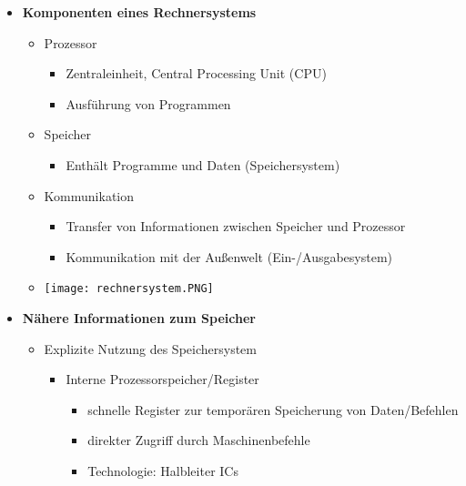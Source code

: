 \begin{itemize}
        \item \textbf{Komponenten eines Rechnersystems}
            \begin{itemize}
                \item Prozessor
                    \begin{itemize}
                        \item Zentraleinheit, Central Processing Unit (CPU)
                        \item Ausführung von Programmen
                    \end{itemize}
                \item Speicher
                    \begin{itemize}
                        \item Enthält Programme und Daten (Speichersystem)
                    \end{itemize}
                \item Kommunikation
                    \begin{itemize}
                        \item Transfer von Informationen zwischen Speicher und Prozessor
                        \item Kommunikation mit der Außenwelt (Ein-/Ausgabesystem)
                    \end{itemize}
                \item[] \texttt{[image: rechnersystem.PNG]}
            \end{itemize}

        \item \textbf{Nähere Informationen zum Speicher} 
            \begin{itemize}
                \item Explizite Nutzung des Speichersystem
                    \begin{itemize}
                        \item Interne Prozessorspeicher/Register
                            \begin{itemize}
                                \item schnelle Register zur temporären Speicherung von Daten/Befehlen
                                \item direkter Zugriff durch Maschinenbefehle
                                \item Technologie: Halbleiter ICs
                            \end{itemize}
                        

\end{itemize}
\end{itemize}
\end{itemize}
